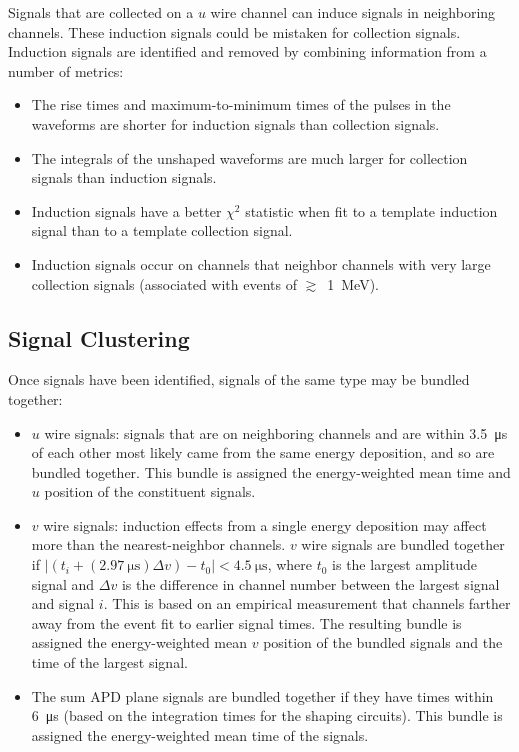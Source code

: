 \documentclass[herrin-thesis.tex]{subfiles}
\begin{document}
Signals that are collected on a \(u\) wire channel can induce signals in neighboring channels. These induction signals could be mistaken for collection signals. Induction signals are identified and removed by combining information from a number of metrics:
\begin{itemize}
\item The rise times and maximum-to-minimum times of the pulses in the waveforms are shorter for induction signals than collection signals.
\item The integrals of the unshaped waveforms are much larger for collection signals than induction signals.
\item Induction signals have a better \(\chi^2\) statistic when fit to a template induction signal than to a template collection signal.
\item Induction signals occur on channels that neighbor channels with very large collection signals (associated with events of \(\gtrsim\)~\SI{1}{\MeV}).
\end{itemize}

\subsection{Signal Clustering}
Once signals have been identified, signals of the same type may be bundled together:
\begin{itemize}
\item \(u\) wire signals: signals that are on neighboring channels and are within \SI{3.5}{\micro\s} of each other most likely came from the same energy deposition, and so are bundled together. This bundle is assigned the energy-weighted mean time and \(u\) position of the constituent signals.
\item \(v\) wire signals: induction effects from a single energy deposition may affect more than the nearest-neighbor channels. \(v\) wire signals are bundled together if \(|(t_{i} + (\SI{2.97}{\micro\s})\Delta v) - t_0|< \SI{4.5}{\micro\s}\), where \(t_0\) is the largest amplitude signal and \(\Delta v\) is the difference in channel number between the largest signal and signal \(i\). This is based on an empirical measurement that channels farther away from the event fit to earlier signal times. The resulting bundle is assigned the energy-weighted mean \(v\) position of the bundled signals and the time of the largest signal.
\item The sum APD plane signals are bundled together if they have times within \SI{6}{\micro\s} (based on the integration times for the shaping circuits). This bundle is assigned the energy-weighted mean time of the signals.
\end{itemize}
\end{document}
